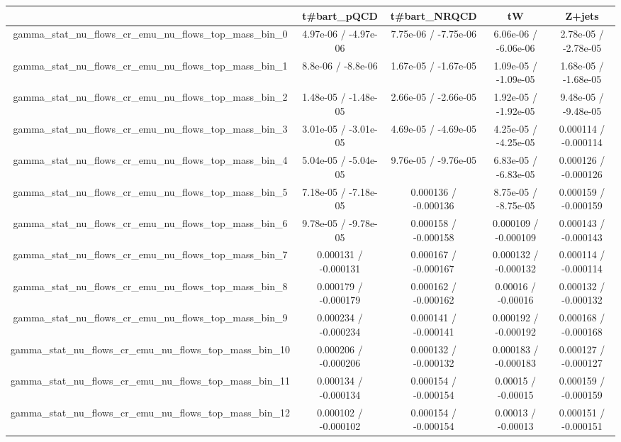 \documentclass[10pt]{article}
\begin{document}
\begin{table}[htbp]
\begin{center}
\begin{tabular}{|c|c|c|c|c|}
\hline 
      & t#bar{t}_{pQCD}      & t#bar{t}_{NRQCD}      & tW      & Z+jets \\ 
\hline 
  gamma_stat_nu_flows_cr_emu_nu_flows_top_mass_bin_0 & 4.97e-06 / -4.97e-06 & 7.75e-06 / -7.75e-06 & 6.06e-06 / -6.06e-06 & 2.78e-05 / -2.78e-05 \\ 
  gamma_stat_nu_flows_cr_emu_nu_flows_top_mass_bin_1 & 8.8e-06 / -8.8e-06 & 1.67e-05 / -1.67e-05 & 1.09e-05 / -1.09e-05 & 1.68e-05 / -1.68e-05 \\ 
  gamma_stat_nu_flows_cr_emu_nu_flows_top_mass_bin_2 & 1.48e-05 / -1.48e-05 & 2.66e-05 / -2.66e-05 & 1.92e-05 / -1.92e-05 & 9.48e-05 / -9.48e-05 \\ 
  gamma_stat_nu_flows_cr_emu_nu_flows_top_mass_bin_3 & 3.01e-05 / -3.01e-05 & 4.69e-05 / -4.69e-05 & 4.25e-05 / -4.25e-05 & 0.000114 / -0.000114 \\ 
  gamma_stat_nu_flows_cr_emu_nu_flows_top_mass_bin_4 & 5.04e-05 / -5.04e-05 & 9.76e-05 / -9.76e-05 & 6.83e-05 / -6.83e-05 & 0.000126 / -0.000126 \\ 
  gamma_stat_nu_flows_cr_emu_nu_flows_top_mass_bin_5 & 7.18e-05 / -7.18e-05 & 0.000136 / -0.000136 & 8.75e-05 / -8.75e-05 & 0.000159 / -0.000159 \\ 
  gamma_stat_nu_flows_cr_emu_nu_flows_top_mass_bin_6 & 9.78e-05 / -9.78e-05 & 0.000158 / -0.000158 & 0.000109 / -0.000109 & 0.000143 / -0.000143 \\ 
  gamma_stat_nu_flows_cr_emu_nu_flows_top_mass_bin_7 & 0.000131 / -0.000131 & 0.000167 / -0.000167 & 0.000132 / -0.000132 & 0.000114 / -0.000114 \\ 
  gamma_stat_nu_flows_cr_emu_nu_flows_top_mass_bin_8 & 0.000179 / -0.000179 & 0.000162 / -0.000162 & 0.00016 / -0.00016 & 0.000132 / -0.000132 \\ 
  gamma_stat_nu_flows_cr_emu_nu_flows_top_mass_bin_9 & 0.000234 / -0.000234 & 0.000141 / -0.000141 & 0.000192 / -0.000192 & 0.000168 / -0.000168 \\ 
  gamma_stat_nu_flows_cr_emu_nu_flows_top_mass_bin_10 & 0.000206 / -0.000206 & 0.000132 / -0.000132 & 0.000183 / -0.000183 & 0.000127 / -0.000127 \\ 
  gamma_stat_nu_flows_cr_emu_nu_flows_top_mass_bin_11 & 0.000134 / -0.000134 & 0.000154 / -0.000154 & 0.00015 / -0.00015 & 0.000159 / -0.000159 \\ 
  gamma_stat_nu_flows_cr_emu_nu_flows_top_mass_bin_12 & 0.000102 / -0.000102 & 0.000154 / -0.000154 & 0.00013 / -0.00013 & 0.000151 / -0.000151 \\ 

\end{tabular}
\end{center}
\end{table}
\end{document}
